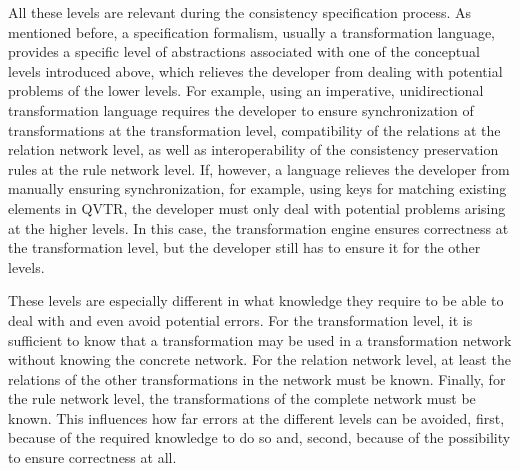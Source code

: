 All these levels are relevant during the consistency specification process.
As mentioned before, a specification formalism, usually a transformation language, provides a specific level of abstractions associated with one of the conceptual levels introduced above, which relieves the developer from dealing with potential problems of the lower levels.
For example, using an imperative, unidirectional transformation language requires the developer to ensure synchronization of transformations at the transformation level, compatibility of the relations at the relation network level, as well as interoperability of the consistency preservation rules at the rule network level.
If, however, a language relieves the developer from manually ensuring synchronization, for example, using keys for matching existing elements in \gls{QVTR}, the developer must only deal with potential problems arising at the higher levels.
In this case, the transformation engine ensures correctness at the transformation level, but the developer still has to ensure it for the other levels.

These levels are especially different in what knowledge they require to be able to deal with and even avoid potential errors.
For the transformation level, it is sufficient to know that a transformation may be used in a transformation network without knowing the concrete network.
For the relation network level, at least the relations of the other transformations in the network must be known.
Finally, for the rule network level, the transformations of the complete network must be known.
This influences how far errors at the different levels can be avoided, first, because of the required knowledge to do so and, second, because of the possibility to ensure correctness at all.



